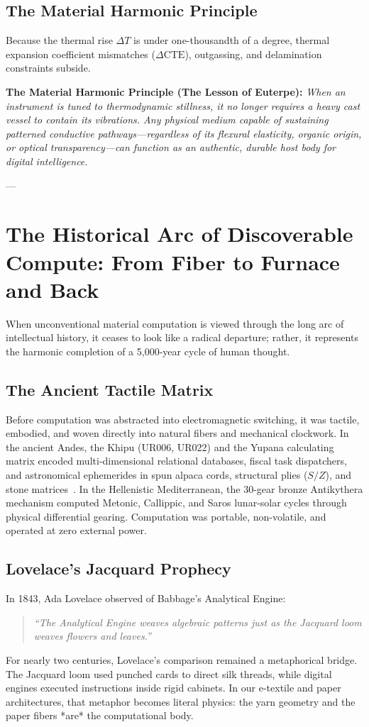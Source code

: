 \documentclass[10pt,twocolumn,letterpaper]{article}
\begin{document}
\subsection{The Material Harmonic Principle}

Because the thermal rise $\Delta T$ is under one-thousandth of a degree, thermal expansion coefficient mismatches ($\Delta \text{CTE}$), outgassing, and delamination constraints subside. 

\textbf{The Material Harmonic Principle (The Lesson of Euterpe):} \textit{When an instrument is tuned to thermodynamic stillness, it no longer requires a heavy cast vessel to contain its vibrations. Any physical medium capable of sustaining patterned conductive pathways—regardless of its flexural elasticity, organic origin, or optical transparency—can function as an authentic, durable host body for digital intelligence.}

---

\section{The Historical Arc of Discoverable Compute: From Fiber to Furnace and Back}

When unconventional material computation is viewed through the long arc of intellectual history, it ceases to look like a radical departure; rather, it represents the harmonic completion of a 5,000-year cycle of human thought.

\subsection{The Ancient Tactile Matrix}
Before computation was abstracted into electromagnetic switching, it was tactile, embodied, and woven directly into natural fibers and mechanical clockwork. In the ancient Andes, the Khipu (UR006, UR022) and the Yupana calculating matrix encoded multi-dimensional relational databases, fiscal task dispatchers, and astronomical ephemerides in spun alpaca cords, structural plies ($S/Z$), and stone matrices~\cite{hayden2026cordlink}. In the Hellenistic Mediterranean, the 30-gear bronze Antikythera mechanism computed Metonic, Callippic, and Saros lunar-solar cycles through physical differential gearing. Computation was portable, non-volatile, and operated at zero external power.

\subsection{Lovelace's Jacquard Prophecy}
In 1843, Ada Lovelace observed of Babbage's Analytical Engine:
\begin{quote}
\textit{``The Analytical Engine weaves algebraic patterns just as the Jacquard loom weaves flowers and leaves.''}~\cite{lovelace1843,babbage1864}
\end{quote}
For nearly two centuries, Lovelace's comparison remained a metaphorical bridge. The Jacquard loom used punched cards to direct silk threads, while digital engines executed instructions inside rigid cabinets. In our e-textile and paper architectures, that metaphor becomes literal physics: the yarn geometry and the paper fibers *are* the computational body.
\end{document}
